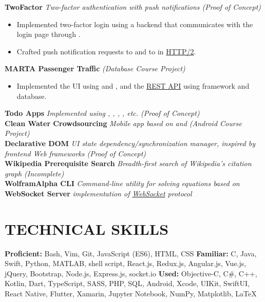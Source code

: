 \documentclass[11pt]{article}
\begin{document}
\vspace{0.5em}
%
\textbf{TwoFactor} \enspace \textit{Two-factor authentication with push notifications (Proof of Concept)}
\begin{itemize}[leftmargin=15pt, noitemsep, topsep=0pt]
\item Implemented two-factor login using a \underline{} backend that communicates with the login page through \underline{}.
\item Crafted push notification requests to \underline{} and to \underline{} in \underline{HTTP/2}.
\end{itemize}
\vspace{0.5em}
%
\textbf{MARTA Passenger Traffic} \enspace \textit{(Database Course Project)}
\begin{itemize}[leftmargin=15pt, noitemsep, topsep=0pt]
\item Implemented the UI using \underline{} and \underline{}, and the \underline{REST API} using \underline{} framework and \underline{} database.
\end{itemize}
\vspace{0.5em}
%
\textbf{Todo Apps} \enspace \textit{Implemented using \underline{}, \underline{}, \underline{}, \underline{}, etc. (Proof of Concept)}\\
\textbf{Clean Water Crowdsourcing}	\enspace \textit{Mobile app based on \underline{} and \underline{} (Android Course Project) }\\
\textbf{Declarative DOM} \enspace \textit{UI state dependency/synchronization manager, inspired by frontend Web frameworks (Proof of Concept)}\\
\textbf{Wikipedia Prerequisite Search} \enspace \textit{Breadth-first search of Wikipedia's citation graph (Incomplete)}\\
\textbf{WolframAlpha CLI} \enspace \textit{Command-line utility for solving equations based on \underline{}}\\
\textbf{WebSocket Server}  \enspace \textit{\underline{} implementation of \underline{WebSocket} protocol}
\vspace{-0.5em}

\section*{TECHNICAL SKILLS}
\textbf{Proficient:} Bash, Vim, Git, JavaScript (ES6), HTML, CSS  \enspace\textbf{Familiar:} C, Java, Swift, Python, MATLAB, shell script, React.js, Redux.js, Angular.js, Vue.js, jQuery, Bootstrap, Node.js, Express.js, socket.io \enspace\textbf{Used:} Objective-C, C\#, C++, Kotlin, Dart, TypeScript, SASS,  PHP, SQL, Android, Xcode, UIKit, SwiftUI, React Native, Flutter, Xamarin, Jupyter Notebook, NumPy, Matplotlib, LaTeX
\end{document}
